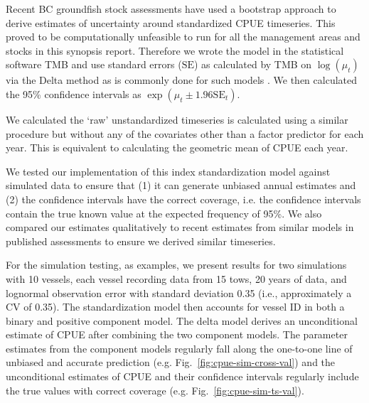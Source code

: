 \documentclass[11pt]{book}\usepackage[]{graphicx}\usepackage[]{color}
\makeatletter
\newenvironment{kframe}{%
 \def\at@end@of@kframe{}%
 \ifinner\ifhmode%
  \def\at@end@of@kframe{\end{minipage}}%
  \begin{minipage}{\columnwidth}%
 \fi\fi%
 \def\FrameCommand##1{\hskip\@totalleftmargin \hskip-\fboxsep
 \colorbox{shadecolor}{##1}\hskip-\fboxsep
     \hskip-\linewidth \hskip-\@totalleftmargin \hskip\columnwidth}%
 \MakeFramed {\advance\hsize-\width
   \@totalleftmargin\z@ \linewidth\hsize
   \@setminipage}}%
 {\par\unskip\endMakeFramed%
 \at@end@of@kframe}
\newenvironment{knitrout}{}{} %
\makeatother
\begin{document}
Recent BC groundfish stock assessments have used a bootstrap approach to derive
estimates of uncertainty around standardized CPUE timeseries. This proved to be
computationally unfeasible to run for all the management areas and stocks in
this synopsis report. Therefore we wrote the model in the statistical software
TMB \citep{kristensen2016} and use standard errors ($\mathrm{SE}$) as calculated
by TMB on $\log (\mu_t)$ via the Delta method as is commonly done for such
models \citep[e.g.][]{thorson2015}. We then calculated the 95\% confidence
intervals as $\exp (\mu_t \pm 1.96 \mathrm{SE}_t)$.

We calculated the `raw' unstandardized timeseries is calculated using a similar
procedure but without any of the covariates other than a factor predictor for
each year. This is equivalent to calculating the geometric mean of CPUE each
year.

We tested our implementation of this index standardization model against
simulated data to ensure that (1) it can generate unbiased annual estimates and
(2) the confidence intervals have the correct coverage, i.e. the confidence
intervals contain the true known value at the expected frequency of 95\%. We
also compared our estimates qualitatively to recent estimates from similar
models in published assessments to ensure we derived similar timeseries.

For the simulation testing, as examples, we present results for two simulations
with 10 vessels, each vessel recording data from 15 tows, 20 years of data, and
lognormal observation error with standard deviation 0.35 (i.e., approximately
a CV of 0.35). The standardization model then accounts for vessel ID in both
a binary and positive component model. The delta model derives an unconditional
estimate of CPUE after combining the two component models. The parameter
estimates from the component models regularly fall along the one-to-one line of
unbiased and accurate prediction (e.g. Fig.~\ref{fig:cpue-sim-cross-val}) and
the unconditional estimates of CPUE and their confidence intervals regularly
include the true values with correct coverage (e.g.
Fig.~\ref{fig:cpue-sim-ts-val}).

\begin{knitrout}
\color{fgcolor}\begin{kframe}


{\ttfamily\noindent{}}

{\ttfamily\noindent\bfseries{}}\end{kframe}
\end{knitrout}
\end{document}

